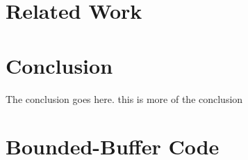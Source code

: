 \documentclass[preprint]{sigplanconf}
\begin{document}
\section{Related Work} \label{sec:related}
\section{Conclusion} \label{sec:conclu}
The conclusion goes here. this is more of the conclusion











\appendix
\section{Bounded-Buffer Code}
\end{document}
